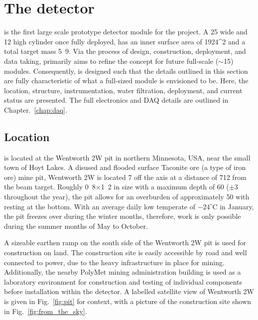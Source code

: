 \section{The \chipsfive detector} %
\label{sec:chips_detector} %

\chipsfive is the first large scale prototype detector module for the \chips project. A
\unit{25}{} wide and \unit{12}{} high cylinder once fully deployed, \chipsfive
has an inner surface area of \unit{1924}{^2} and a total target mass
\unit{5.9}{}. Via the process of design, construction, deployment, and data taking,
\chipsfive primarily aims to refine the \chips concept for future full-scale
($\sim$\unit{15}{}) modules. Consequently, \chipsfive is designed such that the
details outlined in this section are fully characteristic of what a full-sized \chips module is
envisioned to be. Here, the location, structure, instrumentation, water filtration, deployment,
and current status are presented. The full electronics and DAQ details are outlined in
Chapter.~\ref{chap:daq}.

\subsection{Location} %
\label{sec:chips_detector_location} %

\chipsfive is located at the Wentworth 2W pit in northern Minnesota, USA, near the small town of
Hoyt Lakes. A disused and flooded surface Taconite ore (a type of iron ore) mine pit, Wentworth 2W
is located \unit{7}{} off the \numi axis at a distance of \unit{712}{}
from the beam target. Roughly \unit{0.8}{}$\times$\unit{1.2}{} in size with
a maximum depth of \unit{60}{} ($\pm$\unit{3}{} throughout the year), the pit
allows for an overburden of approximately \unit{50}{} with \chipsfive resting at the
bottom. With an average daily low temperate of $-24^{\circ}\mathrm{C}$ in January, the pit freezes
over during the winter months, therefore, work is only possible during the summer months of May to
October.

A sizeable earthen ramp on the south side of the Wentworth 2W pit is used for construction on
land. The construction site is easily accessible by road and well connected to power, due to the
heavy infrastructure in place for mining. Additionally, the nearby PolyMet mining administration
building is used as a laboratory environment for construction and testing of individual components
before installation within the detector. A labelled satellite view of Wentworth 2W is given in
Fig.~\ref{fig:pit} for context, with a picture of the construction site shown in
Fig.~\ref{fig:from_the_sky}.

